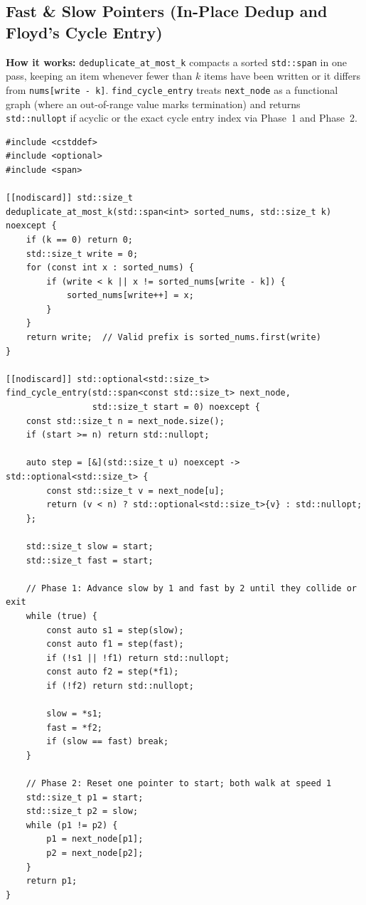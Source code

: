 \documentclass[11pt,a4paper]{article}
\theoremstyle{definition}
\begin{document}
\subsection{Fast \& Slow Pointers (In-Place Dedup and Floyd's Cycle Entry)}

\textbf{How it works:} \texttt{deduplicate\_at\_most\_k} compacts a sorted \texttt{std::span} in one pass, keeping an item whenever fewer than $k$ items have been written or it differs from \texttt{nums[write - k]}. \texttt{find\_cycle\_entry} treats \texttt{next\_node} as a functional graph (where an out-of-range value marks termination) and returns \texttt{std::nullopt} if acyclic or the exact cycle entry index via Phase~1 and Phase~2.

\begin{lstlisting}[caption={In-place sorted deduplication (at most $k$ copies) and Floyd's cycle entry.}]
#include <cstddef>
#include <optional>
#include <span>

[[nodiscard]] std::size_t
deduplicate_at_most_k(std::span<int> sorted_nums, std::size_t k) noexcept {
    if (k == 0) return 0;
    std::size_t write = 0;
    for (const int x : sorted_nums) {
        if (write < k || x != sorted_nums[write - k]) {
            sorted_nums[write++] = x;
        }
    }
    return write;  // Valid prefix is sorted_nums.first(write)
}

[[nodiscard]] std::optional<std::size_t>
find_cycle_entry(std::span<const std::size_t> next_node,
                 std::size_t start = 0) noexcept {
    const std::size_t n = next_node.size();
    if (start >= n) return std::nullopt;

    auto step = [&](std::size_t u) noexcept -> std::optional<std::size_t> {
        const std::size_t v = next_node[u];
        return (v < n) ? std::optional<std::size_t>{v} : std::nullopt;
    };

    std::size_t slow = start;
    std::size_t fast = start;

    // Phase 1: Advance slow by 1 and fast by 2 until they collide or exit
    while (true) {
        const auto s1 = step(slow);
        const auto f1 = step(fast);
        if (!s1 || !f1) return std::nullopt;
        const auto f2 = step(*f1);
        if (!f2) return std::nullopt;

        slow = *s1;
        fast = *f2;
        if (slow == fast) break;
    }

    // Phase 2: Reset one pointer to start; both walk at speed 1
    std::size_t p1 = start;
    std::size_t p2 = slow;
    while (p1 != p2) {
        p1 = next_node[p1];
        p2 = next_node[p2];
    }
    return p1;
}
\end{lstlisting}
\end{document}
